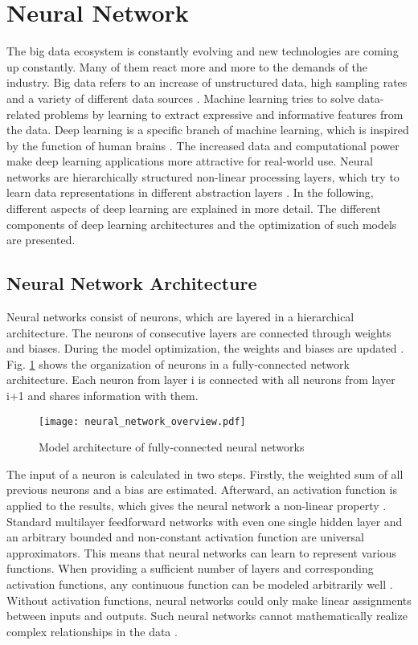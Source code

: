 \section{Neural Network}
The big data ecosystem is constantly evolving and new technologies are coming up constantly. Many of them react more and more to the demands of the industry. Big data refers to an increase of unstructured data, high sampling rates and a variety of different data sources \cite{Sagiroglu2013}. Machine learning tries to solve data-related problems by learning to extract expressive and informative features from the data. Deep learning is a specific branch of machine learning, which is inspired by the function of human brains \cite{Calin2020}. The increased data and computational power make deep learning applications more attractive for real-world use. Neural networks are hierarchically structured non-linear processing layers, which try to learn data representations in different abstraction layers \cite{ZHAO2019213}. In the following, different aspects of deep learning are explained in more detail. The different components of deep learning architectures and the optimization of such models are presented. 

\subsection{Neural Network Architecture}
Neural networks consist of neurons, which are layered in a hierarchical architecture. The neurons of consecutive layers are connected through weights and biases. During the model optimization, the weights and biases are updated \cite{ShilohPerl2020}. Fig. \ref{fig:neural_network_overview} shows the organization of neurons in a fully-connected network architecture. Each neuron from layer i is connected with all neurons from layer i+1 and shares information with them.

\begin{figure}[H]
  \centering
  \texttt{[image: neural\_network\_overview.pdf]}
  \caption {Model architecture of fully-connected neural networks}
  \label{fig:neural_network_overview}
\end{figure}
The input of a neuron is calculated in two steps. Firstly, the weighted sum of all previous neurons and a bias are estimated. Afterward, an activation function is applied to the results, which gives the neural network a non-linear property \cite{ShilohPerl2020}. Standard multilayer feedforward networks with even one single hidden layer and an arbitrary bounded and non-constant activation function are universal approximators. This means that neural networks can learn to represent various functions. When providing a sufficient number of layers and corresponding activation functions, any continuous function can be modeled arbitrarily well \cite{HORNIK1991}. Without activation functions, neural networks could only make linear assignments between inputs and outputs. Such neural networks cannot mathematically realize complex relationships in the data \cite{Ding2018}.

